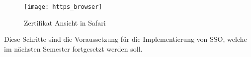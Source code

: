 \begin{figure}[h]
    \centering
    \texttt{[image: https\_browser]}
    \caption{Zertifikat Ansicht in Safari}
    \label{fig:https_browser}
\end{figure}

Diese Schritte sind die Voraussetzung für die Implementierung von SSO, welche im nächsten Semester fortgesetzt werden soll.